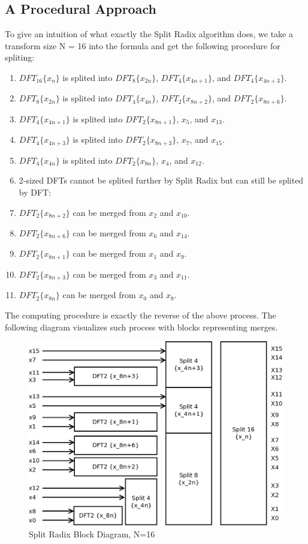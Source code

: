 \documentclass[a4paper]{report}
\begin{document}
\subsection{A Procedural Approach} \indent

	To give an intuition of what exactly the Split Radix algorithm does, we take a transform size N = 16 into the formula and get the following procedure for spliting:
	
	\begin{enumerate}
	\item $DFT_{16}\{x_n\}$ is splited into $DFT_{8}\{x_{2n}\}$, $DFT_{4}\{x_{4n+1}\}$, and $DFT_{4}\{x_{4n+3}\}$.
	\item $DFT_{8}\{x_{2n}\}$ is splited into $DFT_{4}\{x_{4n}\}$, $DFT_{2}\{x_{8n+2}\}$, and $DFT_{2}\{x_{8n+6}\}$.
	\item $DFT_{4}\{x_{4n+1}\}$ is splited into $DFT_{2}\{x_{8n+1}\}$, $x_5$, and $x_{13}$.
	\item $DFT_{4}\{x_{4n+3}\}$ is splited into $DFT_{2}\{x_{8n+3}\}$, $x_7$, and $x_{15}$.
	\item $DFT_{4}\{x_{4n}\}$ is splited into $DFT_{2}\{x_{8n}\}$, $x_4$, and $x_{12}$.
	\item 2-sized DFTs cannot be splited further by Split Radix but can still be splited by DFT:
	\item $DFT_{2}\{x_{8n+2}\}$ can be merged from $x_2$ and $x_{10}$.
	\item $DFT_{2}\{x_{8n+6}\}$ can be merged from $x_6$ and $x_{14}$.
	\item $DFT_{2}\{x_{8n+1}\}$ can be merged from $x_1$ and $x_{9}$.
	\item $DFT_{2}\{x_{8n+3}\}$ can be merged from $x_3$ and $x_{11}$.
	\item $DFT_{2}\{x_{8n}\}$ can be merged from $x_0$ and $x_{8}$.
	\end{enumerate}
	
	The computing procedure is exactly the reverse of the above process. The following diagram visualizes such process with blocks representing merges.

\begin{figure}[htp]
\centering
\includegraphics[scale=0.3]{../dia/split-radix-16.png}
\caption{Split Radix Block Diagram, N=16}
\end{figure}
\end{document}
